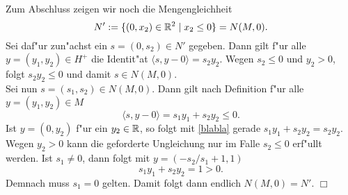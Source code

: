 \begin{itemize}
Zum Abschluss zeigen wir noch die Mengengleichheit
\[
N':= \{(0,x_2) \in \mathbb{R}^2 \mid x_2 \le 0\} = N(M,0).
\]
Sei daf"ur zun"achst ein $s = (0,s_2) \in N'$ gegeben. Dann gilt f"ur alle
$y = (y_1, y_2) \in H^+$ die Identit"at
$
\langle s,y-0 \rangle = s_2 y_2
$.
Wegen $s_2 \le 0$ und $y_2 > 0$, folgt $s_2 y_2 \le 0$ und damit $s \in N(M,0)$.\\

Sei nun $s=(s_1, s_2) \in N(M,0)$. Dann gilt nach Definition f"ur alle $y = (y_1, y_2)\in M$
\begin{equation}\label{blabla}
\langle s,y-0 \rangle = s_1 y_1 + s_2 y_2 \le 0.
\end{equation}
Ist $y = (0, y_2)$ f"ur ein $y_2 \in \mathbb{R}$, so folgt mit \eqref{blabla}
gerade $s_1 y_1 + s_2 y_2= s_2 y_2$. Wegen $y_2 > 0$ kann die geforderte Ungleichung
nur im Falle $s_2 \le 0$ erf"ullt werden. Ist $s_1 \neq 0$, dann folgt mit $y=(-s_2/s_1 + 1, 1)$
\[
s_1 y_1 + s_2 y_2 = 1 > 0.
\]
Demnach muss $s_1 = 0$ gelten. Damit folgt dann endlich $N(M,0)= N'$. \hfill $\Box$


\end{itemize}
